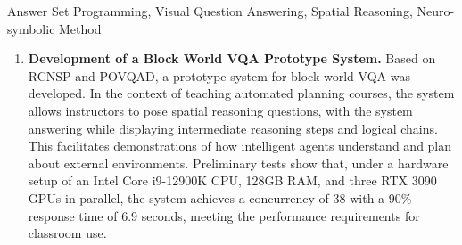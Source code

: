 \begin{englishabstract}{Answer Set Programming, Visual Question Answering, Spatial Reasoning, Neuro-symbolic Method}
\begin{enumerate}[nosep]
\item \textbf{Development of a Block World VQA Prototype System.} Based on RCNSP and POVQAD, a prototype system for block world VQA was developed. In the context of teaching automated planning courses, the system allows instructors to pose spatial reasoning questions, with the system answering while displaying intermediate reasoning steps and logical chains. This facilitates demonstrations of how intelligent agents understand and plan about external environments. Preliminary tests show that, under a hardware setup of an Intel Core i9-12900K CPU, 128GB RAM, and three RTX 3090 GPUs in parallel, the system achieves a concurrency of 38 with a 90\% response time of 6.9 seconds, meeting the performance requirements for classroom use.
\end{enumerate}
\end{englishabstract}

\tableofcontents
\listofothers
